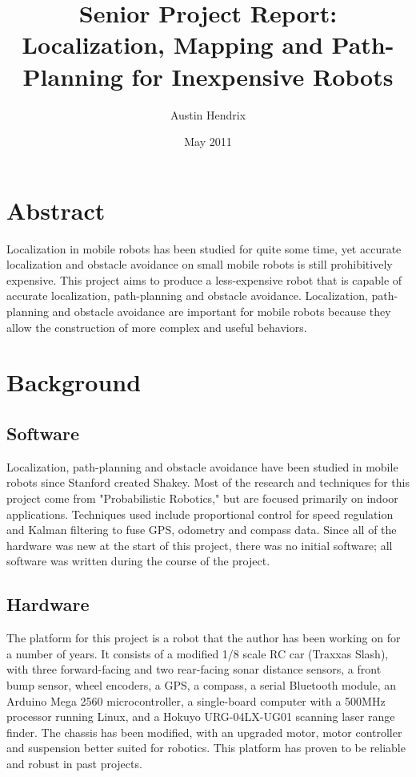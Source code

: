 \documentclass[a4paper,12pt]{article}
\begin{document}
\title{Senior Project Report: Localization, Mapping and Path-Planning for Inexpensive Robots}
\author{Austin Hendrix}
\date{May 2011}
\maketitle

\section{Abstract}
Localization in mobile robots has been studied for quite some time, yet accurate localization and obstacle avoidance on small mobile robots is still prohibitively expensive. 
This project aims to produce a less-expensive robot that is capable of accurate localization, path-planning and obstacle avoidance. Localization, path-planning and obstacle avoidance are important for mobile robots because they allow the construction of more complex and useful behaviors.


\section{Background}
\subsection{Software}
Localization, path-planning and obstacle avoidance have been studied in mobile robots since Stanford created Shakey\cite{shakey}. Most of the research and techniques for this project come from "Probabilistic Robotics,"\cite{thrun} but are focused primarily on indoor applications. Techniques used include proportional control for speed regulation and Kalman filtering to fuse GPS, odometry and compass data. Since all of the hardware was new at the start of this project, there was no initial software; all software was written during the course of the project.

\subsection{Hardware}
The platform for this project is a robot that the author has been working on for a number of years. It consists of a modified 1/8 scale RC car (Traxxas Slash\cite{traxxas}), with three forward-facing and two rear-facing sonar distance sensors, a front bump sensor, wheel encoders, a GPS, a compass, a serial Bluetooth module, an Arduino Mega 2560 microcontroller, a single-board computer with a 500MHz processor running Linux, and a Hokuyo URG-04LX-UG01 scanning laser range finder. The chassis has been modified, with an upgraded motor, motor controller and suspension better suited for robotics. This platform has proven to be reliable and robust in past projects.
\end{document}
